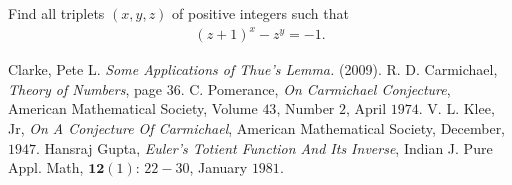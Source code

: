 \documentclass{subfile}
\begin{document}
	\begin{problem} %
		Find all triplets $ (x,y,z)$ of positive integers such that
			\begin{align*}
				(z+1)^x-z^y=-1.
			\end{align*}
	\end{problem}
	
	
	\begin{thebibliography}{99}
		 Clarke, Pete L. \textit{Some Applications of Thue's Lemma.} (2009).
		 R. D. Carmichael, \textit{Theory of Numbers}, page $36$.
		 C. Pomerance, \textit{On Carmichael Conjecture}, American Mathematical Society, Volume $43$, Number $2$, April $1974$.
		 V. L. Klee, Jr, \textit{On A Conjecture Of Carmichael}, American Mathematical Society, December, $1947$.
		 Hansraj Gupta, \textit{Euler's Totient Function And Its Inverse}, Indian J. Pure Appl. Math, $\mathbf{12}(1)$: $22-30$, January $1981$.
	\end{thebibliography}
	
\end{document}
